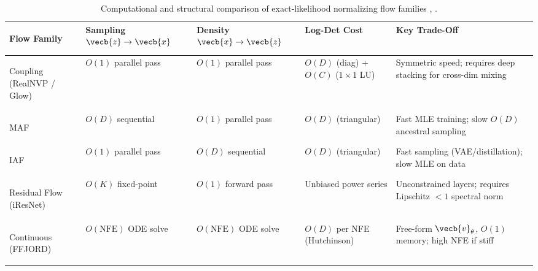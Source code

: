 \documentclass[../../../../master.tex]{subfiles}
\begin{document}
\begin{table}[htbp]
\centering
\small
\begin{tabularx}{\textwidth}{@{} >{\bfseries\raggedright\arraybackslash}p{2.7cm} >{\raggedright\arraybackslash}X >{\raggedright\arraybackslash}X >{\raggedright\arraybackslash}X >{\raggedright\arraybackslash}X @{}}
\toprule
\textbf{Flow Family} & \textbf{Sampling $\vecb{z} \to \vecb{x}$} & \textbf{Density $\vecb{x} \to \vecb{z}$} & \textbf{Log-Det Cost} & \textbf{Key Trade-Off} \\
\midrule
Coupling (RealNVP / Glow) & $O(1)$ parallel pass & $O(1)$ parallel pass & $O(D)$ (diag) + $O(C)$ ($1{\times}1$ LU) & Symmetric speed; requires deep stacking for cross-dim mixing \\
MAF & $O(D)$ sequential & $O(1)$ parallel pass & $O(D)$ (triangular) & Fast MLE training; slow $O(D)$ ancestral sampling \\
IAF & $O(1)$ parallel pass & $O(D)$ sequential & $O(D)$ (triangular) & Fast sampling (VAE/distillation); slow MLE on data \\
Residual Flow (iResNet) & $O(K)$ fixed-point & $O(1)$ forward pass & Unbiased power series & Unconstrained layers; requires Lipschitz $< 1$ spectral norm \\
Continuous (FFJORD) & $O(\text{NFE})$ ODE solve & $O(\text{NFE})$ ODE solve & $O(D)$ per NFE (Hutchinson) & Free-form $\vecb{v}_\theta$, $O(1)$ memory; high NFE if stiff \\
\bottomrule
\end{tabularx}
\caption{Computational and structural comparison of exact-likelihood normalizing flow families , .}\label{tab:flow:complexity}
\end{table}
\end{document}
